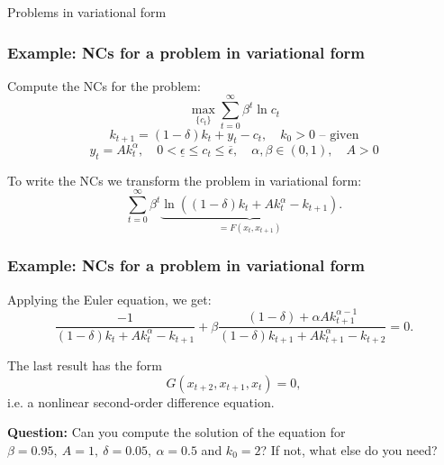 \documentclass[10pt]{beamer}
\theoremstyle{definition}
\begin{document}
\begin{section}{Problems in variational form}
\begin{frame}[fragile]
\frametitle{Example: NCs for a problem in variational form}
Compute the NCs for the problem:
\[ \max_{\{c_t\}} \sum_{t=0}^{\infty}\beta^t \ln c_t  \]
\[ k_{t+1} = (1-\delta)k_t + y_t - c_t,\quad k_0>0 \text{ -- given} \] \[ y_t=A k_t^\alpha , \quad 0<\underline{\epsilon} \leq c_t \leq \overline{\epsilon}, \quad \alpha,\beta \in (0,1), \quad A>0\]\bigskip \pause

To write the NCs we transform the problem in variational form: 
\[ \sum_{t=0}^{\infty}\beta^t \underbrace{\ln ((1-\delta)k_t + A k_t^\alpha - k_{t+1})}_{= F(x_t,x_{t+1})}. \]
\end{frame}



\begin{frame}[fragile]
\frametitle{Example: NCs for a problem in variational form}
Applying the Euler equation, we get:
\[ \frac{-1}{(1-\delta)k_t +A k_t^\alpha -k_{t+1}} + \beta \frac{(1-\delta) + \alpha A k_{t+1}^{\alpha -1}}{(1-\delta)k_{t+1} +A k_{t+1}^\alpha -k_{t+2}} = 0. \]

The last result has the form 
\[ G(x_{t+2},x_{t+1},x_t)=0, \]
i.e. a nonlinear second-order difference equation.

\pause \bigskip
\textbf{Question:} Can you compute the solution of the equation for $ \beta = 0.95,~A=1,~ \delta = 0.05,~ \alpha = 0.5 $ and $ k_0 = 2 $? \pause If not, what else do you need?
\end{frame}

\end{section}
\end{document}
